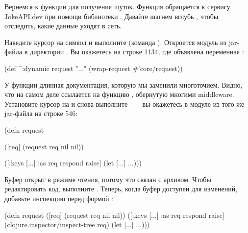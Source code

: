 Вернемся к функции  для получения шуток. Функция обращается к сервису JokeAPI.dev при помощи библиотеки . Давайте шагнем вглубь , чтобы отследить, какие данные уходят в сеть.

Наведите курсор на символ  и выполните  (команда ). Откроется модуль  из jar-файла в директории . Вы окажетесь на строке 1134, где объявлена переменная :

\begin{english}
  \begin{clojure}
(def ^:dynamic request
  "..."
  (wrap-request #'core/request))
  \end{clojure}
\end{english}

У функции длинная документация, которую мы заменили многоточием. Видно, что  на самом деле ссылается на функцию , обернутую многими middleware. Установите курсор на  и снова выполните ~--- вы окажетесь в модуле  из того же jar-файла на строке 546:

\begin{english}
  \begin{clojure}
(defn request

  ([req]
   (request req nil nil))

  ([{:keys [...] :as req} respond raise]
   (let [...]
     ...)))
  \end{clojure}
\end{english}

Буфер  открыт в режиме чтения, потому что связан с архивом. Чтобы редактировать код, выполните . Теперь, когда буфер доступен для изменений, добавьте инспекцию перед формой  :


\pagebreaklarge

\begin{english}
  \begin{clojure/lines}
(defn request
  ([req] (request req nil nil))
  ([{:keys [...]
     :as req} respond raise]
   (clojure.inspector/inspect-tree req)
   (let [...]
     ...)))
  \end{clojure/lines}
\end{english}

